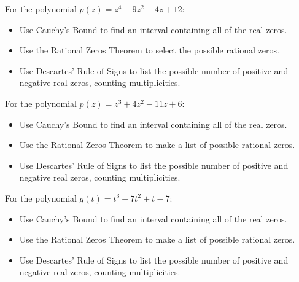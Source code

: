 \documentclass{ximera}
\begin{document}
\begin{problem}
For the polynomial $p(z) = z^{4} - 9z^{2} - 4z + 12$:

\begin{itemize}
\item  Use Cauchy's Bound to find an interval containing all of the real zeros.
\item  Use the Rational Zeros Theorem to select the possible rational zeros.
\begin{selectAll}
  \end{selectAll}
\item  Use Descartes' Rule of Signs to list the possible number of positive and negative real zeros, counting multiplicities.
\end{itemize}
\end{problem}

\begin{problem}
For the polynomial $p(z) = z^{3} + 4z^{2} - 11z + 6$:

\begin{itemize}
\item  Use Cauchy's Bound to find an interval containing all of the real zeros.
\item  Use the Rational Zeros Theorem to make a list of possible rational zeros.

\begin{selectAll}
  \end{selectAll}


\item  Use Descartes' Rule of Signs to list the possible number of positive and negative real zeros, counting multiplicities.
\end{itemize}
\end{problem}

\begin{problem}
For the polynomial $g(t) = t^{3} - 7t^{2} + t - 7$:

\begin{itemize}
\item  Use Cauchy's Bound to find an interval containing all of the real zeros.
\item  Use the Rational Zeros Theorem to make a list of possible rational zeros.
\item  Use Descartes' Rule of Signs to list the possible number of positive and negative real zeros, counting multiplicities.
\end{itemize}
\end{problem}
\end{document}
